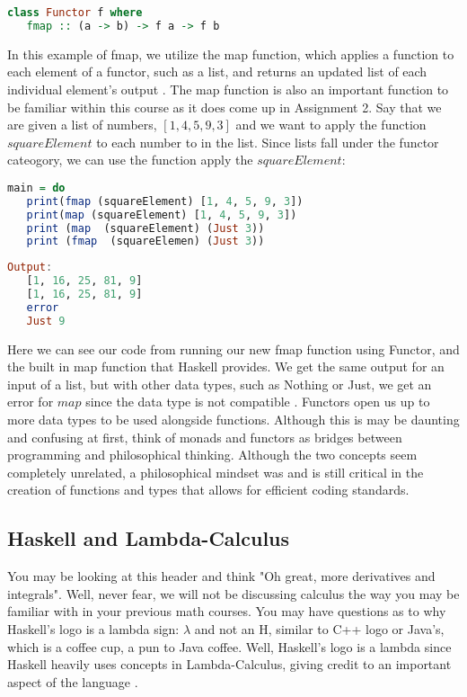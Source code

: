 \documentclass{article}
\begin{document}
\begin{lstlisting}[language=haskell] 
class Functor f where 
   fmap :: (a -> b) -> f a -> f b 
\end{lstlisting}

\medskip\noindent
In this example of fmap, we utilize the map function, which applies a function to each element of a functor, such as a list, and returns an updated list of each individual element's output \cite{TP Functors}. The map function is also an important function to be familiar within this course as it does come up in Assignment 2. Say that we are given a list of numbers, $[1, 4, 5, 9, 3]$ and we want to apply the function $squareElement$ to each number to in the list. Since lists fall under the functor cateogory, we can use the function apply the $squareElement$:

\begin{lstlisting}[language=haskell] 
main = do  
   print(fmap (squareElement) [1, 4, 5, 9, 3])
   print(map (squareElement) [1, 4, 5, 9, 3])
   print (map  (squareElement) (Just 3))
   print (fmap  (squareElemen) (Just 3))
\end{lstlisting}

\begin{lstlisting}[language=haskell] 
Output:
   [1, 16, 25, 81, 9]
   [1, 16, 25, 81, 9]
   error
   Just 9
\end{lstlisting}

\medskip\noindent
Here we can see our code from running our new fmap function using Functor, and the built in map function that Haskell provides. We get the same output for an input of a list, but with other data types, such as Nothing or Just, we get an error for $map$ since the data type is not compatible \cite{TP Functors}. Functors open us up to more data types to be used alongside functions. Although this is may be daunting and confusing at first, think of monads and functors as bridges between programming and philosophical thinking. Although the two concepts seem completely unrelated, a philosophical mindset was and is still critical in the creation of functions and types that allows for efficient coding standards.

\subsection{Haskell and Lambda-Calculus}

You may be looking at this header and think "Oh great, more derivatives and integrals". Well, never fear, we will not be discussing calculus the way you may be familiar with in your previous math courses. You may have questions as to why Haskell's logo is a lambda sign: $\lambda$ and not an H, similar to C++ logo or Java's, which is a coffee cup, a pun to Java coffee. Well, Haskell's logo is a lambda since Haskell heavily uses concepts in Lambda-Calculus, giving credit to an important aspect of the language \cite{Haskell Logo}.
\end{document}
